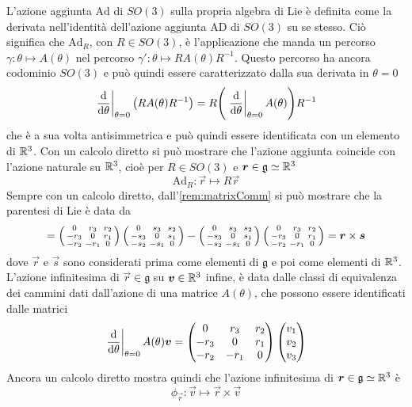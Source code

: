 L'azione aggiunta $\mathrm{Ad}$ di $SO(3)$ sulla propria algebra di Lie è definita come la derivata nell'identità dell'azione aggiunta $\mathrm{AD}$ di $SO(3) $ su se stesso. Ciò significa che $\mathrm{Ad}_R$, con $R \in SO(3)$, è l'applicazione che manda un percorso $\gamma: \theta \mapsto A(\theta)$ nel percorso $\gamma': \theta \mapsto R A(\theta) R^{-1}$. Questo percorso ha ancora codominio $SO(3)$ e può quindi essere caratterizzato dalla sua derivata in $\theta = 0$
\begin{equation*}
\eval{\dv{\theta}}_{\theta=0} \big(R A(\theta)R^{-1}\big) = R \Bigg(\eval{\dv{\theta}}_{\theta=0} A(\theta)\Bigg) R^{-1}
\end{equation*}  
che è a sua volta antisimmetrica e può quindi essere identificata con un elemento di $\mathbb{R}^3$. Con un calcolo diretto si può mostrare che l'azione aggiunta coincide con l'azione naturale su $\mathbb{R}^3$, cioè per $R \in SO(3)$ e $\boldsymbol{r} \in \mathfrak{g} \simeq \mathbb{R}^3$
\begin{equation*}
\mathrm{Ad}_R: \vec{r} \mapsto R \vec{r}
\end{equation*} 
Sempre con un calcolo diretto, dall'\autoref{rem:matrixComm} si può mostrare che la parentesi di Lie è data da
\begin{equation*}
  [\vec{r},\vec{s}] = \left( \smqty{
    0 & r_3 & r_2 \\
    -r_3 & 0 & r_1 \\
    -r_2 & -r_1 & 0
  } \right)  \left( \smqty{
    0 & s_3 & s_2 \\
    -s_3 & 0 & s_1 \\
    -s_2 & -s_1 & 0
  } \right)  - \left( \smqty{
    0 & s_3 & s_2 \\
    -s_3 & 0 & s_1 \\
    -s_2 & -s_1 & 0
  } \right)  \left( \smqty{
    0 & r_3 & r_2 \\
    -r_3 & 0 & r_1 \\
    -r_2 & -r_1 & 0
  } \right)  = \vec{r} \times \vec{s} 
\end{equation*} 
dove $\vec{r}$ e $\vec{s}$ sono considerati prima come elementi di $\mathfrak{g}$ e poi come elementi di $\mathbb{R}^3$. L'azione infinitesima di $\vec{r} \in \mathfrak{g}$ su $\boldsymbol{v} \in \mathbb{R}^3$ infine, è data dalle classi di equivalenza dei cammini dati dall'azione di una matrice $A(\theta)$, che possono essere identificati dalle matrici
\begin{equation*}
\eval{\dv{\theta}}_{\theta=0} A(\theta) \vec{v} = \pmqty{
  0 & r_3 & r_2 \\
  -r_3 & 0 & r_1 \\
  -r_2 & -r_1 & 0
} \mqty(v_1 \\ v_2 \\v_3)
\end{equation*} 
Ancora un calcolo diretto mostra quindi che l'azione infinitesima di $\boldsymbol{r} \in \mathfrak{g} \simeq \mathbb{R}^3$ è 
\begin{equation*}
\phi_{\vec{r}}: \vec{v} \mapsto \vec{r}\times \vec{v}
\end{equation*}

